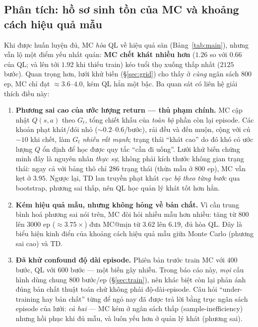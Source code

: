 \documentclass[11pt,a4paper]{article}
\begin{document}
\subsection{Phân tích: hồ sơ sinh tồn của MC và khoảng cách hiệu quả mẫu}
Khi được huấn luyện đủ, MC \emph{hòa} QL về hiệu quả săn (Bảng~\ref{tab:main}), nhưng vẫn lộ một
điểm yếu nhất quán: \textbf{MC chết khát nhiều hơn} ($1.26$ so với $0.66$ của QL; và lên tới $1.92$
khi thiếu train) kéo tuổi thọ xuống thấp nhất ($2125$ bước). Quan trọng hơn, lưới khử biến
(\S\ref{sec:grid}) cho thấy ở \emph{cùng} ngân sách $800$ ep, MC chỉ đạt $\approx 3.6$--$4.0$, kém
QL hẳn một bậc. Ba quan sát có liên hệ giải thích điều này:

\begin{enumerate}[leftmargin=1.6em,itemsep=2pt]
  \item \textbf{Phương sai cao của ước lượng return --- thủ phạm chính.} MC cập nhật $Q(s,a)$ theo
        $G_t$, tổng chiết khấu của \emph{toàn bộ} phần còn lại episode. Các khoản phạt khát/đói nhỏ
        ($\sim 0.2$--$0.6$/bước), rải đều và đến muộn, cộng với cú $-10$ khi chết, làm $G_t$ \emph{nhiễu
        rất mạnh}; trạng thái ``khát cao'' do đó khó có ước lượng $Q$ ổn định để học được quy tắc
        ``cần đi uống''. Lưới khử biến chứng minh đây là nguyên nhân \emph{thực sự}, không phải kích
        thước không gian trạng thái: ngay cả với bảng thô chỉ $286$ trạng thái (thừa mẫu ở $800$ ep),
        MC vẫn kẹt ở $3.95$. Ngược lại, TD lan truyền phạt khát \emph{cục bộ theo từng bước} qua
        bootstrap, phương sai thấp, nên QL học quản lý khát tốt hơn hẳn.
  \item \textbf{Kém hiệu quả mẫu, nhưng không hỏng về bản chất.} Vì cần trung bình hoá phương sai
        nói trên, MC đòi hỏi nhiều mẫu hơn nhiều: tăng từ $800$ lên $3000$ ep ($\approx 3.75\times$)
        đưa MC@mịn từ $3.62$ lên $6.19$, đủ hòa QL. Đây là biểu hiện kinh điển của khoảng cách hiệu
        quả mẫu giữa Monte Carlo (phương sai cao) và TD.
  \item \textbf{Đã khử confound độ dài episode.} Phiên bản trước train MC với $400$ bước, QL với
        $600$ bước --- một biến gây nhiễu. Trong báo cáo này, \emph{mọi} cấu hình dùng chung $800$
        bước/ep (\S\ref{sec:train}), nên khác biệt còn lại phản ánh đúng bản chất thuật toán chứ
        không phải độ-dài-episode. Câu hỏi ``under-training hay bản chất'' từng để ngỏ nay đã được
        trả lời bằng trục ngân sách episode của lưới: \emph{cả hai} --- MC kém ở ngân sách thấp
        (sample-inefficiency) nhưng hồi phục khi đủ mẫu, và luôn yếu hơn ở quản lý khát (phương sai).
\end{enumerate}
\end{document}

